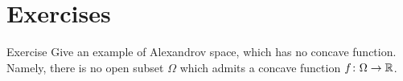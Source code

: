 \chapter{Exercises}

\begin{thm}{Exercise}
Give an example of Alexandrov space, which has no concave function.
Namely, there is no open subset $\Omega$ which admits a concave function $f\:\Omega\to \RR$.
\end{thm}

